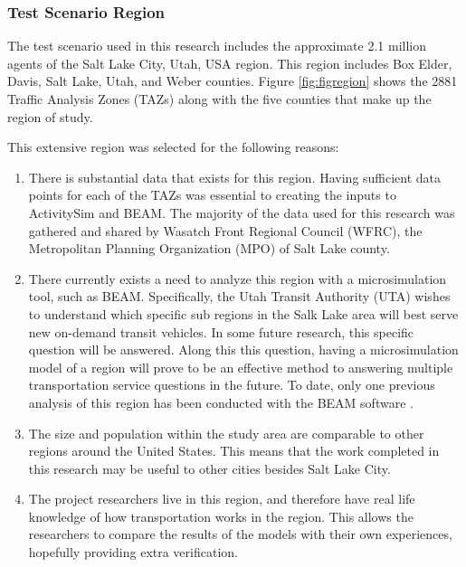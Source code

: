 \documentclass[3p, authoryear, review]{elsarticle} %
\providecommand{\tightlist}{%
  \setlength{\itemsep}{0pt}\setlength{\parskip}{0pt}}
\begin{document}
\hypertarget{test-scenario-region}{%
\subsubsection{Test Scenario Region}\label{test-scenario-region}}

The test scenario used in this research includes the approximate 2.1 million agents of the Salt Lake City, Utah, USA region. This region includes Box Elder, Davis, Salt Lake, Utah, and Weber counties. Figure \ref{fig:figregion} shows the 2881 Traffic Analysis Zones (TAZs) along with the five counties that make up the region of study.

This extensive region was selected for the following reasons:

\begin{enumerate}
\def\labelenumi{\arabic{enumi}.}
\tightlist
\item
  There is substantial data that exists for this region. Having sufficient data points for each of the TAZs was essential to creating the inputs to ActivitySim and BEAM. The majority of the data used for this research was gathered and shared by Wasatch Front Regional Council (WFRC), the Metropolitan Planning Organization (MPO) of Salt Lake county.
\item
  There currently exists a need to analyze this region with a microsimulation tool, such as BEAM. Specifically, the Utah Transit Authority (UTA) wishes to understand which specific sub regions in the Salk Lake area will best serve new on-demand transit vehicles. In some future research, this specific question will be answered. Along this this question, having a microsimulation model of a region will prove to be an effective method to answering multiple transportation service questions in the future. To date, only one previous analysis of this region has been conducted with the BEAM software \citep{nate}.
\item
  The size and population within the study area are comparable to other regions around the United States. This means that the work completed in this research may be useful to other cities besides Salt Lake City.
\item
  The project researchers live in this region, and therefore have real life knowledge of how transportation works in the region. This allows the researchers to compare the results of the models with their own experiences, hopefully providing extra verification.
\end{enumerate}
\end{document}
